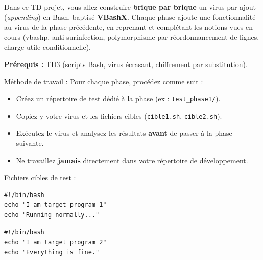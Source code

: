 \documentclass[a4paper,11pt]{article}
\theoremstyle{plain}
\theoremstyle{definition}
\begin{document}
\noindent
Dans ce TD-projet, vous allez construire \textbf{brique par brique} un virus par ajout (\textit{appending}) en Bash, baptisé \textbf{VBashX}. Chaque phase ajoute une fonctionnalité au virus de la phase précédente, en reprenant et complétant les notions vues en cours (vbashp, anti-surinfection, polymorphisme par réordonnancement de lignes, charge utile conditionnelle).

\medskip
\noindent\textbf{Prérequis :} TD3 (scripts Bash, virus écrasant, chiffrement par substitution).

\bigskip

{\Large Méthode de travail :} Pour chaque phase, procédez comme suit :
\begin{itemize}
\item Créez un répertoire de test dédié à la phase (ex : \texttt{test\_phase1/}).
\item Copiez-y votre virus et les fichiers cibles (\texttt{cible1.sh}, \texttt{cible2.sh}).
\item Exécutez le virus et analysez les résultats \textbf{avant} de passer à la phase suivante.
\item Ne travaillez \textbf{jamais} directement dans votre répertoire de développement.
\end{itemize}

\noindent Fichiers cibles de test :
\begin{lstlisting}[title=cible1.sh]
#!/bin/bash
echo "I am target program 1"
echo "Running normally..."
\end{lstlisting}
\begin{lstlisting}[title=cible2.sh]
#!/bin/bash
echo "I am target program 2"
echo "Everything is fine."
\end{lstlisting}

\bigskip

\end{document}

